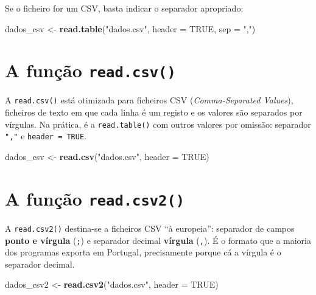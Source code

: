 \documentclass[
  portuguese,
  11pt,
  openany]{book}
\newenvironment{Shaded}{\begin{snugshade}}{\end{snugshade}}
\newcommand{\AttributeTok}[1]{\textcolor[rgb]{0.13,0.29,0.53}{#1}}
\newcommand{\ConstantTok}[1]{\textcolor[rgb]{0.56,0.35,0.01}{#1}}
\newcommand{\FunctionTok}[1]{\textcolor[rgb]{0.13,0.29,0.53}{\textbf{#1}}}
\newcommand{\NormalTok}[1]{#1}
\newcommand{\OtherTok}[1]{\textcolor[rgb]{0.56,0.35,0.01}{#1}}
\newcommand{\StringTok}[1]{\textcolor[rgb]{0.31,0.60,0.02}{#1}}
\begin{document}
Se o ficheiro for um CSV, basta indicar o separador apropriado:

\begin{Shaded}
\begin{Highlighting}[]
\NormalTok{dados\_csv }\OtherTok{\textless{}{-}} \FunctionTok{read.table}\NormalTok{(}\StringTok{"dados.csv"}\NormalTok{, }\AttributeTok{header =} \ConstantTok{TRUE}\NormalTok{, }\AttributeTok{sep =} \StringTok{","}\NormalTok{)}
\end{Highlighting}
\end{Shaded}

\section{\texorpdfstring{A função \texttt{read.csv()}}{A função read.csv()}}\label{a-funuxe7uxe3o-read.csv}

A \texttt{read.csv()} está otimizada para ficheiros CSV (\emph{Comma-Separated Values}),
ficheiros de texto em que cada linha é um registo e os valores são separados por
vírgulas. Na prática, é a \texttt{read.table()} com outros valores por omissão: separador
\texttt{","} e \texttt{header\ =\ TRUE}.

\begin{Shaded}
\begin{Highlighting}[]
\NormalTok{dados\_csv }\OtherTok{\textless{}{-}} \FunctionTok{read.csv}\NormalTok{(}\StringTok{"dados.csv"}\NormalTok{, }\AttributeTok{header =} \ConstantTok{TRUE}\NormalTok{)}
\end{Highlighting}
\end{Shaded}

\section{\texorpdfstring{A função \texttt{read.csv2()}}{A função read.csv2()}}\label{a-funuxe7uxe3o-read.csv2}

A \texttt{read.csv2()} destina-se a ficheiros CSV ``à europeia'': separador de campos \textbf{ponto
e vírgula} (\texttt{;}) e separador decimal \textbf{vírgula} (\texttt{,}). É o formato que a maioria
dos programas exporta em Portugal, precisamente porque cá a vírgula é o separador
decimal.

\begin{Shaded}
\begin{Highlighting}[]
\NormalTok{dados\_csv2 }\OtherTok{\textless{}{-}} \FunctionTok{read.csv2}\NormalTok{(}\StringTok{"dados.csv"}\NormalTok{, }\AttributeTok{header =} \ConstantTok{TRUE}\NormalTok{)}
\end{Highlighting}
\end{Shaded}
\end{document}

